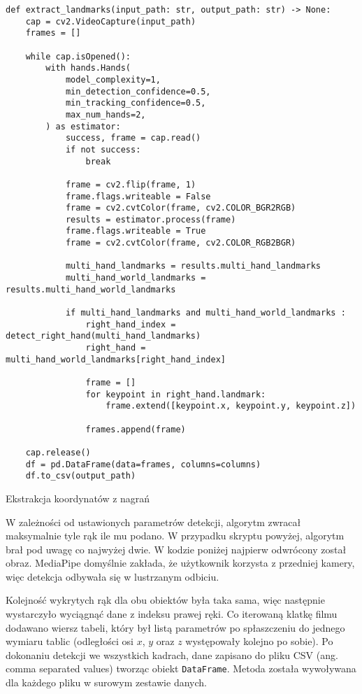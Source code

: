 \begin{listing}[H]
    \color{white}
    \begin{verbatim}
def extract_landmarks(input_path: str, output_path: str) -> None:
    cap = cv2.VideoCapture(input_path)
    frames = []

    while cap.isOpened():
        with hands.Hands(
            model_complexity=1,
            min_detection_confidence=0.5,
            min_tracking_confidence=0.5,
            max_num_hands=2,
        ) as estimator:
            success, frame = cap.read()
            if not success:
                break

            frame = cv2.flip(frame, 1)
            frame.flags.writeable = False
            frame = cv2.cvtColor(frame, cv2.COLOR_BGR2RGB)
            results = estimator.process(frame)
            frame.flags.writeable = True
            frame = cv2.cvtColor(frame, cv2.COLOR_RGB2BGR)

            multi_hand_landmarks = results.multi_hand_landmarks
            multi_hand_world_landmarks = results.multi_hand_world_landmarks

            if multi_hand_landmarks and multi_hand_world_landmarks :
                right_hand_index = detect_right_hand(multi_hand_landmarks)
                right_hand = multi_hand_world_landmarks[right_hand_index]

                frame = []
                for keypoint in right_hand.landmark:
                    frame.extend([keypoint.x, keypoint.y, keypoint.z])

                frames.append(frame)

    cap.release()
    df = pd.DataFrame(data=frames, columns=columns)
    df.to_csv(output_path)
    \end{verbatim}
    \caption{Ekstrakcja koordynatów z nagrań}
    \label{lst:recordings-landmarks-extraction}
\end{listing}

W zależności od ustawionych parametrów detekcji, algorytm zwracał maksymalnie tyle rąk ile mu podano. W przypadku skryptu powyżej, algorytm brał pod uwagę co najwyżej dwie. W kodzie poniżej najpierw odwrócony został obraz. MediaPipe domyślnie zakłada, że użytkownik korzysta z przedniej kamery, więc detekcja odbywała się w lustrzanym odbiciu.

Kolejność wykrytych rąk dla obu obiektów była taka sama, więc następnie wystarczyło wyciągnąć dane z indeksu prawej ręki. Co iterowaną klatkę filmu dodawano wiersz tabeli, który był listą parametrów po spłaszczeniu do jednego wymiaru tablic (odległości osi $x$, $y$ oraz $z$ występowały kolejno po sobie). Po dokonaniu detekcji we wszystkich kadrach, dane zapisano do pliku CSV (ang. comma separated values) tworząc obiekt \texttt{DataFrame}. Metoda została wywoływana dla każdego pliku w surowym zestawie danych.

